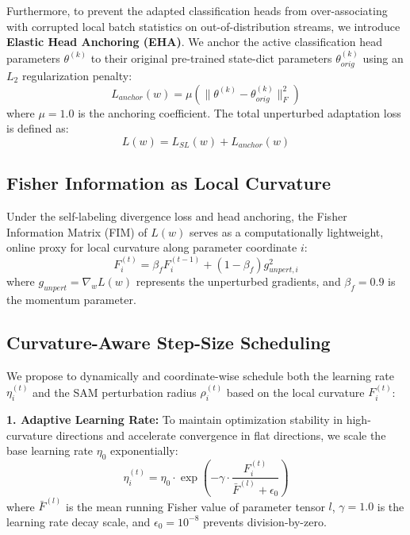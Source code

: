 \documentclass{article}
\theoremstyle{plain}
\theoremstyle{definition}
\theoremstyle{remark}
\begin{document}
Furthermore, to prevent the adapted classification heads from over-associating with corrupted local batch statistics on out-of-distribution streams, we introduce \textbf{Elastic Head Anchoring (EHA)}. We anchor the active classification head parameters $\theta^{(k)}$ to their original pre-trained state-dict parameters $\theta^{(k)}_{orig}$ using an $L_2$ regularization penalty:
\begin{equation}
L_{anchor}(w) = \mu \left( \|\theta^{(k)} - \theta^{(k)}_{orig}\|_F^2 \right)
\end{equation}
where $\mu = 1.0$ is the anchoring coefficient. The total unperturbed adaptation loss is defined as:
\begin{equation}
L(w) = L_{SL}(w) + L_{anchor}(w)
\end{equation}

\subsection{Fisher Information as Local Curvature}
Under the self-labeling divergence loss and head anchoring, the Fisher Information Matrix (FIM) of $L(w)$ serves as a computationally lightweight, online proxy for local curvature along parameter coordinate $i$:
\begin{equation}
F_i^{(t)} = \beta_f F_i^{(t-1)} + (1 - \beta_f) g_{unpert, i}^2
\end{equation}
where $g_{unpert} = \nabla_w L(w)$ represents the unperturbed gradients, and $\beta_f = 0.9$ is the momentum parameter.

\subsection{Curvature-Aware Step-Size Scheduling}
We propose to dynamically and coordinate-wise schedule both the learning rate $\eta_i^{(t)}$ and the SAM perturbation radius $\rho_i^{(t)}$ based on the local curvature $F_i^{(t)}$:

\textbf{1. Adaptive Learning Rate:}
To maintain optimization stability in high-curvature directions and accelerate convergence in flat directions, we scale the base learning rate $\eta_0$ exponentially:
\begin{equation}
\eta_i^{(t)} = \eta_0 \cdot \exp\left(-\gamma \cdot \frac{F_i^{(t)}}{\bar{F}^{(l)} + \epsilon_0}\right)
\end{equation}
where $\bar{F}^{(l)}$ is the mean running Fisher value of parameter tensor $l$, $\gamma = 1.0$ is the learning rate decay scale, and $\epsilon_0 = 10^{-8}$ prevents division-by-zero.
\end{document}

